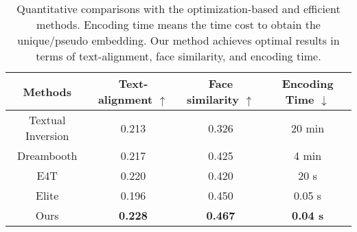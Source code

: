 \begin{table*}[t]
\centering
  \caption{Quantitative comparisons with the optimization-based and efficient methods. Encoding time means the time cost to obtain the unique/pseudo embedding. Our method achieves optimal results in terms of text-alignment, face similarity, and encoding time.}
  \label{tab:main_result}
  \begin{tabular}{cccc}
    \toprule
    Methods & Text-alignment $\uparrow$ & Face similarity $\uparrow$ & Encoding Time $\downarrow$ \\
    \midrule
    Textual Inversion \cite{gal2022image} & 0.213 & 0.326 & 20 min \\ 
    Dreambooth \cite{ruiz2022dreambooth} & 0.217 & 0.425 & 4 min  \\ 
    E4T \cite{gal2023designing} & 0.220 & 0.420 & 20 s \\ 
    Elite \cite{wei2023elite} & 0.196 & 0.450 & 0.05 s\\ 
    \midrule
    Ours & \textbf{0.228} & \textbf{0.467} & \textbf{0.04 s}\\
    \bottomrule
  \end{tabular}
\end{table*}